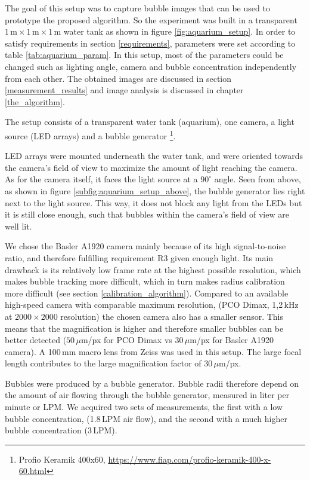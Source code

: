 		The goal of this setup was to capture bubble images that can be used to prototype the proposed algorithm. So the experiment was built in a transparent $1\, \text{m}\times 1 \, \text{m}\times 1 \, \text{m}$ water tank as shown in figure \ref{fig:aquarium_setup}. In order to satisfy requirements in section \ref{requirements}, parameters were set according to table \ref{tab:aquarium_param}. 
		 In this setup, most of the parameters could be changed such as lighting angle, camera and bubble concentration independently from each other. The obtained images are discussed in section \ref{measurement_results} and image analysis is discussed in chapter \ref{the_algorithm}.
		 
		 The setup consists of a transparent water tank (aquarium), one camera, a light source (LED arrays) and a bubble generator \footnote{Profio Keramik 400x60, \url{https://www.fiap.com/profio-keramik-400-x-60.html}}. 
		 
		 LED arrays were mounted underneath the water tank, and were oriented towards the camera's field of view to maximize the amount of light reaching the camera. As for the camera itself, it faces the light source at a $90^\circ$ angle. 
		 Seen from above, as shown in figure \ref{subfig:aquarium_setup_above}, the bubble generator lies right next to the light source. This way, it does not block any light from the LEDs but it is still close enough, such that bubbles within the camera's field of view are well lit. 
		
		We chose the Basler A1920 camera mainly because of its high signal-to-noise ratio, and therefore fulfilling requirement R3 given enough light. Its main drawback is its relatively low frame rate at the highest possible resolution, which makes bubble tracking more difficult, which in turn makes radius calibration more difficult (see section \ref{calibration_algorithm}). Compared to an available high-speed camera with comparable maximum resolution, (PCO Dimax, 1,2\,kHz at $2000 \times 2000$ resolution) the chosen camera also has a smaller sensor. This means that the magnification is higher and therefore smaller bubbles can be better detected ($50 \, \mu$m/px for PCO Dimax vs $30 \, \mu $m/px for Basler A1920 camera). A 100\,mm macro lens from Zeiss was used in this setup. The large focal length contributes to the large magnification factor of $30 \, \mu$m/px.
	
	Bubbles were produced by a bubble generator. Bubble radii therefore depend on the amount of air flowing through the bubble generator, measured in liter per minute or LPM. We acquired two sets of measurements, the first with a low bubble concentration, (1.8\,LPM air flow), and the second with a much higher bubble concentration (3\,LPM). 
		
